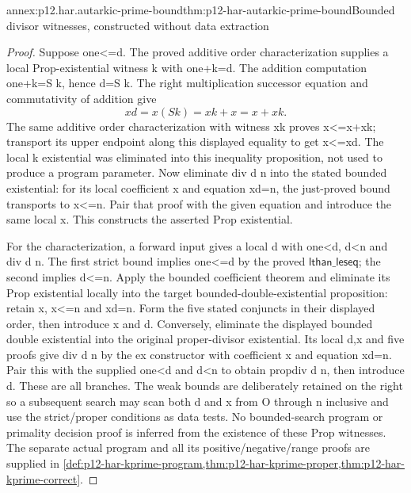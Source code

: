 \begin{annexitem}{annex:p12.har.autarkic-prime-bound}{thm:p12-har-autarkic-prime-bound}{Bounded divisor witnesses, constructed without data extraction}
\begin{proof}
Suppose one<=d. The proved additive order characterization supplies
a local Prop-existential witness k with one+k=d. The addition computation
one+k=S k, hence d=S k. The right multiplication successor equation
and commutativity of addition give
\[
 xd=x(S k)=xk+x=x+xk.
\]
The same additive order characterization with witness xk proves
x<=x+xk; transport its upper endpoint along this displayed equality
to get x<=xd. The local k existential was eliminated into this inequality
proposition, not used to produce a program parameter.
Now eliminate div d n into the stated bounded existential: for its
local coefficient x and equation xd=n, the just-proved bound transports
to x<=n. Pair that proof with the given equation and introduce the
same local x. This constructs the asserted Prop existential.

For the characterization, a forward input gives a local d with
one<d, d<n and div d n. The first strict bound implies one<=d by
the proved \(\mathsf{lthan\_leseq}\); the second implies d<=n. Apply the bounded
coefficient theorem and eliminate its Prop existential locally into
the target bounded-double-existential proposition: retain x, x<=n
and xd=n. Form the five stated conjuncts in their displayed order,
then introduce x and d. Conversely, eliminate the displayed bounded
double existential into the original proper-divisor existential.
Its local d,x and five proofs give div d n by the ex constructor
with coefficient x and equation xd=n. Pair this with the supplied
one<d and d<n to obtain propdiv d n, then introduce d.
These are all branches. The weak bounds are deliberately retained
on the right so a subsequent search may scan both d and x from O
through n inclusive and use the strict/proper conditions as data tests.
No bounded-search program or primality decision proof is inferred from
the existence of these Prop witnesses. The separate actual program and
all its positive/negative/range proofs are supplied in
\cref{def:p12-har-kprime-program,thm:p12-har-kprime-proper,thm:p12-har-kprime-correct}.
\end{proof}
\end{annexitem}


